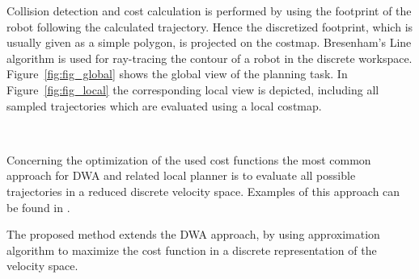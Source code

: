 Collision detection and cost calculation is performed by using the footprint of the robot following the calculated trajectory.
Hence the discretized footprint, which is usually given as a simple polygon, is projected on the costmap. 
Bresenham's Line algorithm \cite{bresenham1965algorithm} is used for ray-tracing the contour of a robot in the discrete workspace. 
Figure~\ref{fig:fig_global} shows the global view of the planning task. 
In Figure~\ref{fig:fig_local} the corresponding local view is depicted, including all sampled trajectories which are evaluated using a local costmap.

\begin{figure}[thpb]
	  \myfloatalign
      \footnotesize
      \centering
     \\    
   \caption[]{}
   \label{fig:fig_overview}
\end{figure}

Concerning the optimization of the used cost functions the most common approach for DWA and related local planner is to evaluate all possible trajectories in a reduced discrete velocity space. 
Examples of this approach can be found in \cite{kiss2012advanced}\cite{DBLP:conf/icra/Marder-EppsteinBFGK10}\cite{conf/icra/SederP07}. 

The proposed method extends the DWA approach, by using approximation algorithm to maximize the cost function in a discrete representation of the velocity space.





